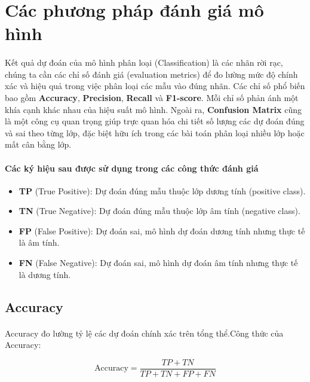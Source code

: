 \newpage
\section{Các phương pháp đánh giá mô hình}

\paragraph{}{Kết quả dự đoán của mô hình phân loại (Classification) là các nhãn rời rạc, chúng ta cần các chỉ số đánh giá (evaluation metrics) để đo lường mức độ chính xác và hiệu quả trong việc phân loại các mẫu vào đúng nhãn. Các chỉ số phổ biến bao gồm \textbf{Accuracy}, \textbf{Precision}, \textbf{Recall} và \textbf{F1-score}. Mỗi chỉ số phản ánh một khía cạnh khác nhau của hiệu suất mô hình. Ngoài ra, \textbf{Confusion Matrix} cũng là một công cụ quan trọng giúp trực quan hóa chi tiết số lượng các dự đoán đúng và sai theo từng lớp, đặc biệt hữu ích trong các bài toán phân loại nhiều lớp hoặc mất cân bằng lớp.}

\paragraph{Các ký hiệu sau được sử dụng trong các công thức đánh giá}

\begin{itemize}
  \item \textbf{TP} (True Positive): Dự đoán đúng mẫu thuộc lớp dương tính (positive class).
  \item \textbf{TN} (True Negative): Dự đoán đúng mẫu thuộc lớp âm tính (negative class).
  \item \textbf{FP} (False Positive): Dự đoán sai, mô hình dự đoán dương tính nhưng thực tế là âm tính.
  \item \textbf{FN} (False Negative): Dự đoán sai, mô hình dự đoán âm tính nhưng thực tế là dương tính.
\end{itemize}

\subsection{Accuracy}

\paragraph{}{Accuracy đo lường tỷ lệ các dự đoán chính xác trên tổng thể.Công thức của Accuracy: }

\[
\text{Accuracy} = \frac{TP + TN}{TP + TN + FP + FN}
\]



